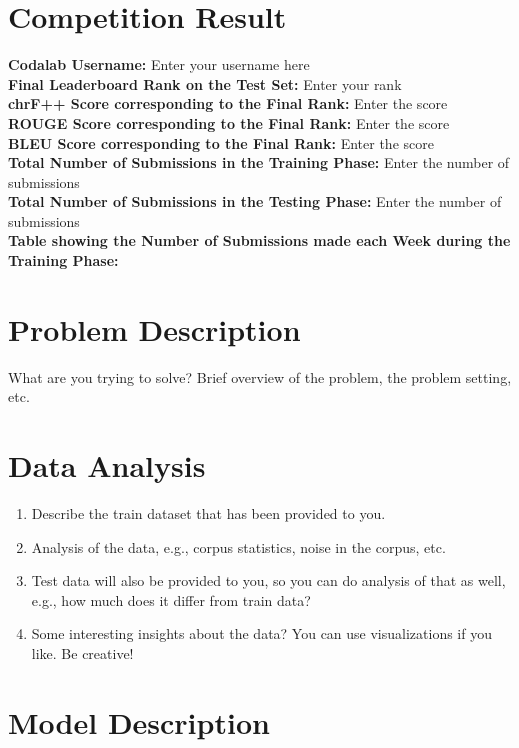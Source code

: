 \documentclass[11pt, oneside]{article}   	%
\begin{document}
\section{Competition Result}
\textbf{Codalab Username:} Enter your username here \\ 
\textbf{Final Leaderboard Rank on the Test Set:} Enter your rank \\ 
\textbf{chrF++ Score corresponding to the Final Rank:} Enter the score \\ 
\textbf{ROUGE Score corresponding to the Final Rank:} Enter the score \\ 
\textbf{BLEU Score corresponding to the Final Rank:} Enter the score \\ 
\textbf{Total Number of Submissions in the Training Phase:} Enter the number of submissions \\ 
\textbf{Total Number of Submissions in the Testing Phase:} Enter the number of submissions \\ 
\textbf{Table showing the Number of Submissions made each Week during the Training Phase:} \\


\section{Problem Description}
What are you trying to solve? Brief overview of the problem, the problem setting, etc. 

\section{Data Analysis}
 \begin{enumerate}
\item Describe the train dataset that has been provided to you. 
\item Analysis of the data, e.g., corpus statistics, noise in the corpus, etc. 
\item Test data will also be provided to you, so you can do analysis of that as well, e.g., how much does it differ from train data? 
\item  Some interesting insights about the data? You can use visualizations if you like. Be creative! 
\end{enumerate}
 

\section{Model Description}
 
\end{document}

